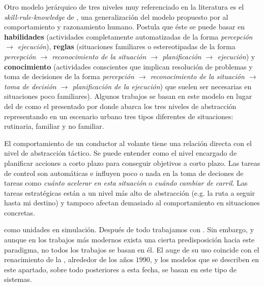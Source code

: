 Otro modelo jerárquico de tres niveles muy referenciado en la literatura es el \textit{skill-rule-knowledge} de \cite{Rasmussen1986}, una generalización del modelo propuesto por \cite{michon1985critical} al comportamiento y razonamiento humano. Postula que éste se puede basar en \textbf{habilidades} (actividades completamente automatizadas de la forma \textit{percepción $\rightarrow$ ejecución}), \textbf{reglas} (situaciones familiares o estereotipadas de la forma \textit{percepción $\rightarrow$ reconocimiento de la situación $\rightarrow$ planificación $\rightarrow$ ejecución}) y \textbf{conocimiento} (actividades conscientes que implican resolución de problemas y toma de decisiones de la forma \textit{percepción $\rightarrow$ reconocimiento de la situación $\rightarrow$ toma de decisión $\rightarrow$ planificación de la ejecución}) que suelen ser necesarias en situaciones poco familiares). Algunos trabajos se basan en este modelo en lugar del de \cite{michon1985critical} como el presentado por \cite{Chaib-draa1994} donde abarca los tres niveles de abstracción representando en un escenario urbano tres tipos diferentes de situaciones: rutinaria, familiar y no familiar.

El comportamiento de un conductor al volante tiene una relación directa con el nivel de abstracción táctico. Se puede entender como el nivel encargado de planificar acciones a corto plazo para conseguir objetivos a corto plazo. Las tareas de control son automáticas e influyen poco o nada en la toma de deciones de tareas como \textit{cuánto acelerar en esta situación} o \textit{cuándo cambiar de carril}. Las tareas estratégicas están a un nivel más alto de abstracción (e.g. la ruta a seguir hasta mi destino) y tampoco afectan demasiado al comportamiento en situaciones concretas.

 como unidades en simulación. Después de todo trabajamos con . Sin embargo, y aunque en los trabajos más modernos exista una cierta predisposición hacia este paradigma, no todos los trabajos se basan en él. El auge de su uso coincide con el renacimiento de la , alrededor de los años $1990$, y los modelos que se describen en este apartado, sobre todo posteriores a esta fecha, se basan en este tipo de sistemas.

